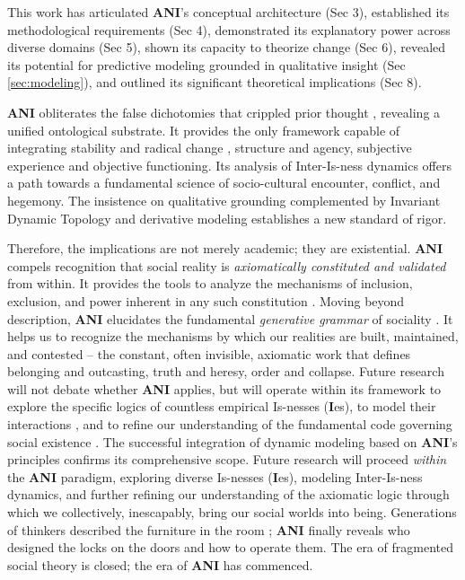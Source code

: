 \documentclass{article}
\newcommand{\ANI}{\textbf{ANI}}             %
\newcommand{\Isness}{\mathbf{I}}            %
\begin{document}
This work has articulated \ANI{}'s conceptual architecture (Sec 3), established its methodological requirements (Sec 4), demonstrated its explanatory power across diverse domains (Sec 5), shown its capacity to theorize change (Sec 6), revealed its potential for predictive modeling grounded in qualitative insight (Sec \ref{sec:modeling}), and outlined its significant theoretical implications (Sec 8).

\ANI{} obliterates the false dichotomies that crippled prior thought \citep{Giddens1984}, revealing a unified ontological substrate. It provides the only framework capable of integrating stability and radical change \citep{Prigogine1984}, structure and agency, subjective experience and objective functioning. Its analysis of Inter-Is-ness dynamics offers a path towards a fundamental science of socio-cultural encounter, conflict, and hegemony. The insistence on qualitative grounding \citep{DenzinLincoln2011} complemented by Invariant Dynamic Topology and derivative modeling establishes a new standard of rigor.

Therefore, the implications are not merely academic; they are existential. \ANI{} compels recognition that social reality is \textit{axiomatically constituted and validated} from within. It provides the tools to analyze the mechanisms of inclusion, exclusion, and power inherent in any such constitution \citep{Foucault1972}. Moving beyond description, \ANI{} elucidates the fundamental \textit{generative grammar} of sociality \citep{Bourdieu1990}. It helps us to recognize the mechanisms by which our realities are built, maintained, and contested – the constant, often invisible, axiomatic work that defines belonging and outcasting, truth and heresy, order and collapse. Future research will not debate whether \ANI{} applies, but will operate within its framework to explore the specific logics of countless empirical Is-nesses ($\Isness$es), to model their interactions \citep{Luhmann1995}, and to refine our understanding of the fundamental code governing social existence \citep{Hofstadter1979}. The successful integration of dynamic modeling based on \ANI{}'s principles confirms its comprehensive scope. Future research will proceed \textit{within} the \ANI{} paradigm, exploring diverse Is-nesses ($\Isness$es), modeling Inter-Is-ness dynamics, and further refining our understanding of the axiomatic logic through which we collectively, inescapably, bring our social worlds into being. Generations of thinkers described the furniture in the room \citep{Geertz1973}; \ANI{} finally reveals who designed the locks on the doors and how to operate them. The era of fragmented social theory is closed; the era of \ANI{} has commenced.
\end{document}
